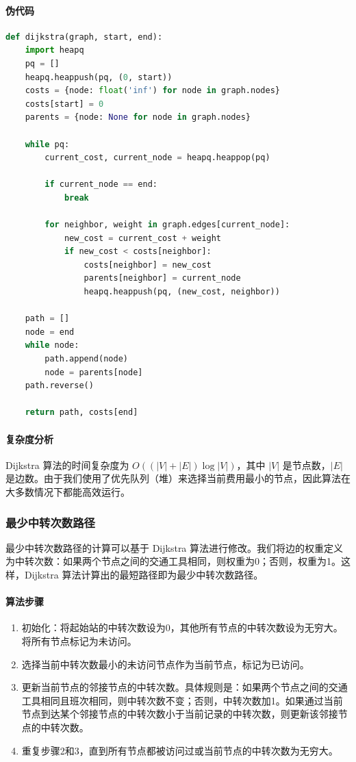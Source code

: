 \documentclass[10pt]{article}
\begin{document}
    \paragraph{伪代码}
    \begin{lstlisting}[language=Python]
def dijkstra(graph, start, end):
    import heapq
    pq = []
    heapq.heappush(pq, (0, start))
    costs = {node: float('inf') for node in graph.nodes}
    costs[start] = 0
    parents = {node: None for node in graph.nodes}

    while pq:
        current_cost, current_node = heapq.heappop(pq)

        if current_node == end:
            break

        for neighbor, weight in graph.edges[current_node]:
            new_cost = current_cost + weight
            if new_cost < costs[neighbor]:
                costs[neighbor] = new_cost
                parents[neighbor] = current_node
                heapq.heappush(pq, (new_cost, neighbor))

    path = []
    node = end
    while node:
        path.append(node)
        node = parents[node]
    path.reverse()

    return path, costs[end]
    \end{lstlisting}

    \paragraph{复杂度分析}
    Dijkstra 算法的时间复杂度为 $O((|V| + |E|) \log |V|)$，其中 $|V|$ 是节点数，$|E|$ 是边数。由于我们使用了优先队列（堆）来选择当前费用最小的节点，因此算法在大多数情况下都能高效运行。

    \subsubsection{最少中转次数路径}

    最少中转次数路径的计算可以基于 Dijkstra 算法进行修改。我们将边的权重定义为中转次数：如果两个节点之间的交通工具相同，则权重为0；否则，权重为1。这样，Dijkstra 算法计算出的最短路径即为最少中转次数路径。

    \paragraph{算法步骤}
    \begin{enumerate}
        \item 初始化：将起始站的中转次数设为0，其他所有节点的中转次数设为无穷大。将所有节点标记为未访问。
        \item 选择当前中转次数最小的未访问节点作为当前节点，标记为已访问。
        \item 更新当前节点的邻接节点的中转次数。具体规则是：如果两个节点之间的交通工具相同且班次相同，则中转次数不变；否则，中转次数加1。如果通过当前节点到达某个邻接节点的中转次数小于当前记录的中转次数，则更新该邻接节点的中转次数。
        \item 重复步骤2和3，直到所有节点都被访问过或当前节点的中转次数为无穷大。
    \end{enumerate}
\end{document}
